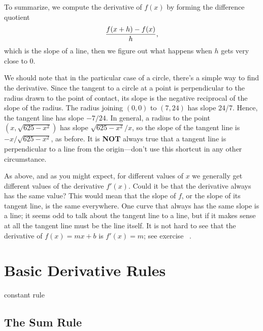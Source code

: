 To summarize, we compute the derivative of $f(x)$ by forming the
difference quotient
$$
{f(x+ h)-f(x)\over  h},
$$
which is the slope of a line, then we figure out what happens when
$h$ gets very close to 0. 


We should note that in 
the particular case of a circle, there's a simple way to find the
derivative.  Since the tangent to a circle at a point is perpendicular to
the radius drawn to the point of contact, its slope is the negative
reciprocal of the slope of the radius.  The radius joining $(0,0)$ to
$(7,24)$ has slope 24/7.  Hence, the tangent line has slope
$-7/24$. In general, a radius to the point $(x,\sqrt{625-x^2})$ has
slope $\sqrt{625-x^2}/x$, so the slope of the tangent line is
${-x/ \sqrt{625-x^2}}$, as before. It is {\bf NOT} always true that a
tangent line is perpendicular to a line from the origin---don't use
this shortcut in any other circumstance. 

As above, and as you might expect, for different values of $x$ we
generally get different values of the derivative $f'(x)$. Could it be
that the derivative always has the same value? This would mean that
the slope of $f$, or the slope of its tangent line, is the same
everywhere. One curve that always has the same slope is a line; it
seems odd to talk about the tangent line to a line, but if it makes
sense at all the tangent line must be the line itself. It is not hard
to see that the derivative of $f(x)=mx+b$ is $f'(x)=m$; see
exercise~ .








\section{Basic Derivative Rules}

constant rule


\subsection{The Sum Rule}

